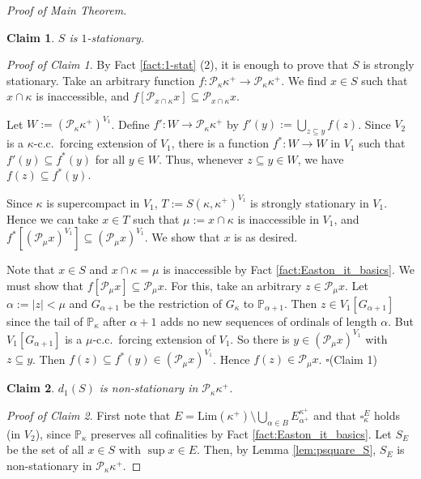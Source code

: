 \documentclass[a4paper,12pt,reqno,oneside]{amsart}
\theoremstyle{plain}
\newtheorem{claim}{Claim}
\newcommand{\mbb}{\mathbb}
\newcommand{\mcal}{\mathcal}
\newcommand{\ltpt}{\mathrm{Lim}}
\begin{document}
\begin{proof}[Proof of Main Theorem]
\begin{claim}
$S$ is $1$-stationary.
\end{claim}

\noindent
\emph{Proof of Claim 1}. By Fact \ref{fact:1-stat} (2), it is enough to prove that $S$ is strongly stationary. Take an arbitrary function $f : \mcal{P}_\kappa \kappa^+ \to \mcal{P}_\kappa \kappa^+$. We find $x \in S$ such that $x \cap \kappa$ is inaccessible, and $f[ \mcal{P}_{x \cap \kappa} x] \subseteq \mcal{P}_{x \cap \kappa} x$.

Let $W := ( \mcal{P}_\kappa \kappa^+ )^{V_1}$. Define $f' : W \to \mcal{P}_\kappa \kappa^+$ by $f' (y) := \bigcup_{z \subseteq y} f(z)$. Since $V_2$ is a $\kappa$-c.c.~forcing extension of $V_1$, there is a function $f^* : W \to W$ in $V_1$ such that $f' (y) \subseteq f^* (y)$ for all $y \in W$. Thus, whenever $z \subseteq y \in W$, we have $f(z) \subseteq f^* (y)$.

Since $\kappa$ is supercompact in $V_1$, $T := S( \kappa , \kappa^+ )^{V_1}$ is strongly stationary in $V_1$. Hence we can take $x \in T$ such that $\mu := x \cap \kappa$ is inaccessible in $V_1$, and $f^* [ ( \mcal{P}_\mu x )^{V_1} ] \subseteq ( \mcal{P}_\mu x )^{V_1}$. We show that $x$ is as desired.

Note that $x \in S$ and $x \cap \kappa = \mu$ is inaccessible by Fact \ref{fact:Easton_it_basics}. We must show that $f[ \mcal{P}_\mu x ] \subseteq \mcal{P}_\mu x$. For this, take an arbitrary $z \in \mcal{P}_\mu x$. Let $\alpha := |z| < \mu$ and $G_{\alpha + 1}$ be the restriction of $G_\kappa$ to $\mbb{P}_{\alpha + 1}$. Then $z \in V_1 [ G_{\alpha + 1} ]$ since the tail of $\mbb{P}_\kappa$ after $\alpha + 1$ adds no new sequences of ordinals of length $\alpha$. But $V_1[ G_{\alpha + 1} ]$ is a $\mu$-c.c.~forcing extension of $V_1$. So there is $y \in ( \mcal{P}_\mu x )^{V_1}$ with $z \subseteq y$. Then $f(z) \subseteq f^* (y) \in ( \mcal{P}_\mu x )^{V_1}$. Hence $f(z) \in \mcal{P}_\mu x$.
\hfill $\square$(Claim 1)

\begin{claim}
$d_1 (S)$ is non-stationary in $\mcal{P}_\kappa \kappa^+$.
\end{claim}

\noindent
\emph{Proof of Claim 2}.
First note that $E = \ltpt ( \kappa^+ ) \setminus \bigcup_{\alpha \in B} E^{\kappa^+}_{\alpha^+}$ and that $\square_\kappa^E$ holds (in $V_2$), since $\mbb{P}_\kappa$ preserves all cofinalities by Fact \ref{fact:Easton_it_basics}. Let $S_E$ be the set of all $x \in S$ with $\sup x \in E$. Then, by Lemma \ref{lem:psquare_S}, $S_E$ is non-stationary in $\mcal{P}_\kappa \kappa^+$.


\end{proof}
\end{document}
